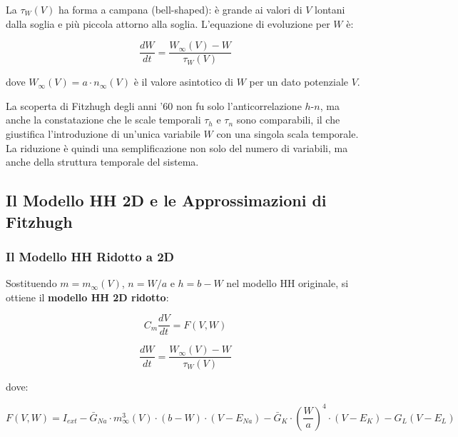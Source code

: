 La $\tau_W(V)$ ha forma a campana (bell-shaped): è grande ai valori di $V$ lontani dalla soglia e più piccola attorno alla soglia. L'equazione di evoluzione per $W$ è:

\begin{equation}
\frac{dW}{dt} = \frac{W_\infty(V) - W}{\tau_W(V)}
\end{equation}

dove $W_\infty(V) = a \cdot n_\infty(V)$ è il valore asintotico di $W$ per un dato potenziale $V$.

\begin{tcolorbox}[colback=gray!5, colframe=gray!40, arc=2mm, boxrule=0.5pt]
 La scoperta di Fitzhugh degli anni '60 non fu solo l'anticorrelazione $h$-$n$, ma anche la constatazione che le scale temporali $\tau_h$ e $\tau_n$ sono comparabili, il che giustifica l'introduzione di un'unica variabile $W$ con una singola scala temporale. La riduzione è quindi una semplificazione non solo del numero di variabili, ma anche della struttura temporale del sistema.
\end{tcolorbox}



\subsection{Il Modello HH 2D e le Approssimazioni di Fitzhugh}

\subsubsection{Il Modello HH Ridotto a 2D}

Sostituendo $m = m_\infty(V)$, $n = W/a$ e $h = b - W$ nel modello HH originale, si ottiene il \textbf{modello HH 2D ridotto}:

\begin{equation}
C_m \frac{dV}{dt} = F(V, W)
\end{equation}

\begin{equation}
\frac{dW}{dt} = \frac{W_\infty(V) - W}{\tau_W(V)}
\end{equation}

dove:

\begin{equation}
F(V, W) = I_{ext} - \bar{G}_{Na} \cdot m_\infty^3(V) \cdot (b - W) \cdot (V - E_{Na}) - \bar{G}_K \cdot \left(\frac{W}{a}\right)^4 \cdot (V - E_K) - G_L(V - E_L)
\end{equation}

